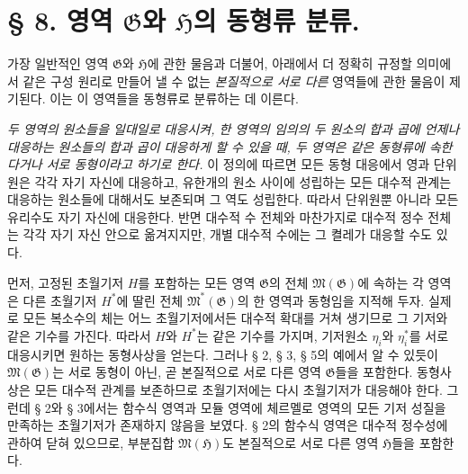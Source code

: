 \section*{§ 8. 영역 $\mathfrak G$와 $\mathfrak H$의 동형류 분류.}

가장 일반적인 영역 $\mathfrak G$와 $\mathfrak H$에 관한 물음과 더불어, 아래에서 더 정확히 규정할 의미에서 같은 구성 원리로 만들어 낼 수 없는 \emph{본질적으로 서로 다른} 영역들에 관한 물음이 제기된다. 이는 이 영역들을 동형류로 분류하는 데 이른다.

\emph{두 영역의 원소들을 일대일로 대응시켜, 한 영역의 임의의 두 원소의 합과 곱에 언제나 대응하는 원소들의 합과 곱이 대응하게 할 수 있을 때, 두 영역은 같은 동형류에 속한다거나 서로 동형이라고 하기로 한다.} 이 정의에 따르면 모든 동형 대응에서 영과 단위원은 각각 자기 자신에 대응하고, 유한개의 원소 사이에 성립하는 모든 대수적 관계는 대응하는 원소들에 대해서도 보존되며 그 역도 성립한다. 따라서 단위원뿐 아니라 모든 유리수도 자기 자신에 대응한다. 반면 대수적 수 전체와 마찬가지로 대수적 정수 전체는 각각 자기 자신 안으로 옮겨지지만, 개별 대수적 수에는 그 켤레가 대응할 수도 있다.

먼저, 고정된 초월기저 $H$를 포함하는 모든 영역 $\mathfrak G$의 전체 $\mathfrak M(\mathfrak G)$에 속하는 각 영역은 다른 초월기저 $H^*$에 딸린 전체 $\mathfrak M^*(\mathfrak G)$의 한 영역과 동형임을 지적해 두자. 실제로 모든 복소수의 체는 어느 초월기저에서든 대수적 확대를 거쳐 생기므로 그 기저와 같은 기수를 가진다. 따라서 $H$와 $H^*$는 같은 기수를 가지며, 기저원소 $\eta_i$와 $\eta_i^*$를 서로 대응시키면 원하는 동형사상을 얻는다. 그러나 § 2, § 3, § 5의 예에서 알 수 있듯이 $\mathfrak M(\mathfrak G)$는 서로 동형이 아닌, 곧 본질적으로 서로 다른 영역 $\mathfrak G$들을 포함한다. 동형사상은 모든 대수적 관계를 보존하므로 초월기저에는 다시 초월기저가 대응해야 한다. 그런데 § 2와 § 3에서는 함수식 영역과 모듈 영역에 체르멜로 영역의 모든 기저 성질을 만족하는 초월기저가 존재하지 않음을 보였다. § 2의 함수식 영역은 대수적 정수성에 관하여 닫혀 있으므로, 부분집합 $\mathfrak M(\mathfrak H)$도 본질적으로 서로 다른 영역 $\mathfrak H$들을 포함한다.

